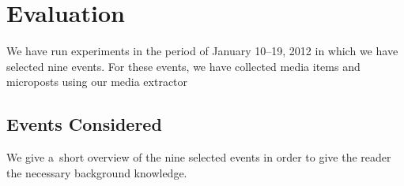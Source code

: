 \section{Evaluation}
\label{sec:evaluation}

We have run experiments in the period of January 10--19, 2012
in which we have selected nine events.
For these events, we have collected media items and microposts
using our media extractor

\subsection{Events Considered}

We give a~short overview of the nine selected events
in order to give the reader the necessary background knowledge.


